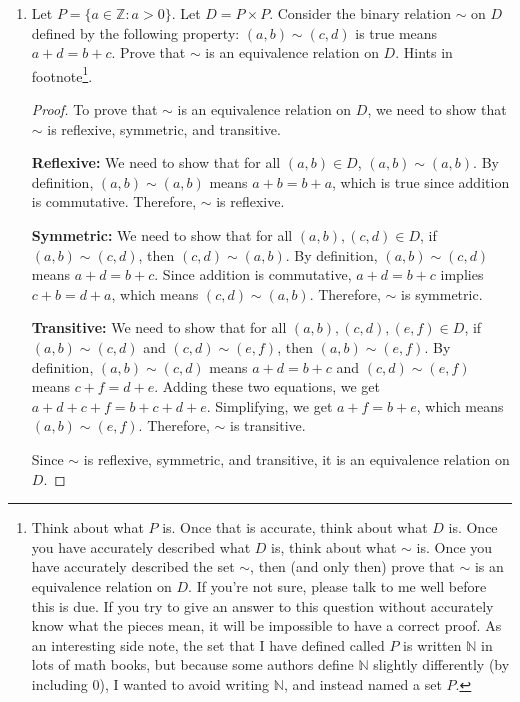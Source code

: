 \documentclass{article}
\begin{document}
\begin{enumerate}

\item Let $P = \{a \in \mathbb{Z} : a > 0\}$. Let $D = P \times P$. Consider the binary relation $\sim$ on $D$ defined by the following property: $(a,b) \sim (c,d)$ is true means $a+d=b+c$. Prove that $\sim$ is an equivalence relation on $D$. Hints in footnote\footnote{Think about what $P$ is. Once that is accurate, think about what $D$ is. Once you have accurately described what $D$ is, think about what $\sim$ is. Once you have accurately described the set $\sim$, then (and only then) prove that $\sim$ is an equivalence relation on $D$. If you're not sure, please talk to me well before this is due. If you try to give an answer to this question without accurately know what the pieces mean, it will be impossible to have a correct proof. As an interesting side note, the set that I have defined called $P$ is written $\mathbb{N}$ in lots of math books, but because some authors define $\mathbb{N}$ slightly differently (by including $0$), I wanted to avoid writing $\mathbb{N}$, and instead named a set $P$.}.

\begin{proof}
    To prove that $\sim$ is an equivalence relation on $D$, we need to show that $\sim$ is reflexive, symmetric, and transitive.

    \textbf{Reflexive:} We need to show that for all $(a,b) \in D$, $(a,b) \sim (a,b)$. By definition, $(a,b) \sim (a,b)$ means $a+b = b+a$, which is true since addition is commutative. Therefore, $\sim$ is reflexive.

    \textbf{Symmetric:} We need to show that for all $(a,b), (c,d) \in D$, if $(a,b) \sim (c,d)$, then $(c,d) \sim (a,b)$. By definition, $(a,b) \sim (c,d)$ means $a+d = b+c$. Since addition is commutative, $a+d = b+c$ implies $c+b = d+a$, which means $(c,d) \sim (a,b)$. Therefore, $\sim$ is symmetric.

    \textbf{Transitive:} We need to show that for all $(a,b), (c,d), (e,f) \in D$, if $(a,b) \sim (c,d)$ and $(c,d) \sim (e,f)$, then $(a,b) \sim (e,f)$. By definition, $(a,b) \sim (c,d)$ means $a+d = b+c$ and $(c,d) \sim (e,f)$ means $c+f = d+e$. Adding these two equations, we get $a+d + c+f = b+c + d+e$. Simplifying, we get $a+f = b+e$, which means $(a,b) \sim (e,f)$. Therefore, $\sim$ is transitive.

    Since $\sim$ is reflexive, symmetric, and transitive, it is an equivalence relation on $D$.
\end{proof}


\end{enumerate}
\end{document}
